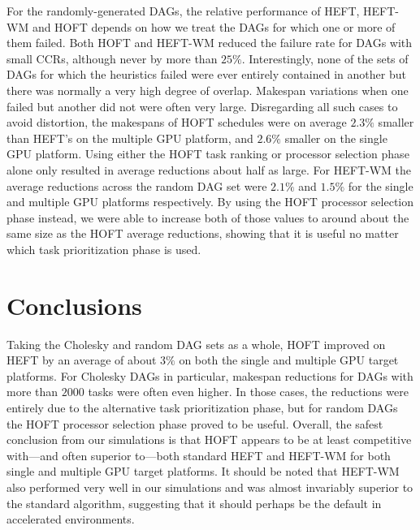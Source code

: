 \documentclass[runningheads]{llncs}
\begin{document}
For the randomly-generated DAGs, the relative performance of HEFT, HEFT-WM and HOFT depends on how we treat the DAGs for which one or more of them failed. Both HOFT and HEFT-WM reduced the failure rate for DAGs with small CCRs, although never by more than $25\%$. Interestingly, none of the sets of DAGs for which the heuristics failed were ever entirely contained in another but there was normally a very high degree of overlap. Makespan variations when one failed but another did not were often very large. Disregarding all such cases to avoid distortion, the makespans of HOFT schedules were on average $2.3\%$ smaller than HEFT's on the multiple GPU platform, and $2.6\%$ smaller on the single GPU platform. Using either the HOFT task ranking or processor selection phase alone only resulted in average reductions about half as large. For HEFT-WM the average reductions across the random DAG set were $2.1\%$ and $1.5\%$ for the single and multiple GPU platforms respectively. By using the HOFT processor selection phase instead, we were able to increase both of those values to around about the same size as the HOFT average reductions, showing that it is useful no matter which task prioritization phase is used.


\section{Conclusions}
\label{sect.conclusion}

Taking the Cholesky and random DAG sets as a whole, HOFT improved on HEFT by an average of about $3\%$ on both the single and multiple GPU target platforms. For Cholesky DAGs in particular, makespan reductions for DAGs with more than $2000$ tasks were often even higher. In those cases, the reductions were entirely due to the alternative task prioritization phase, but for random DAGs the HOFT processor selection phase proved to be useful. Overall, the safest conclusion from our simulations is that HOFT appears to be at least competitive with---and often superior to---both standard HEFT and HEFT-WM for both single and multiple GPU target platforms. It should be noted that HEFT-WM also performed very well in our simulations and was almost invariably superior to the standard algorithm, suggesting that it should perhaps be the default in accelerated environments. 
\end{document}

